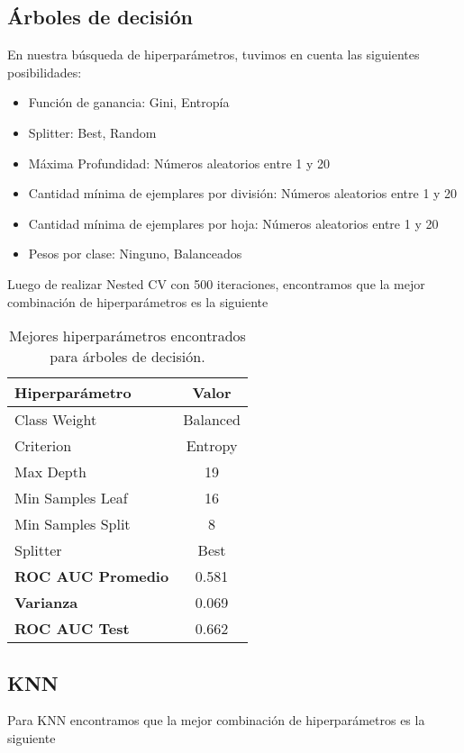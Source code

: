 \documentclass[12pt,a4paper]{article}
\begin{document}
\subsection*{Árboles de decisión}
\par En nuestra búsqueda de hiperparámetros, tuvimos en cuenta las siguientes posibilidades:
\begin{itemize}
    \item Función de ganancia: Gini, Entropía
    \item Splitter: Best, Random
    \item Máxima Profundidad: Números aleatorios entre 1 y 20
    \item Cantidad mínima de ejemplares por división: Números aleatorios entre 1 y 20
    \item Cantidad mínima de ejemplares por hoja: Números aleatorios entre 1 y 20
    \item Pesos por clase: Ninguno, Balanceados
\end{itemize}
\par  Luego de realizar Nested CV con 500 iteraciones, encontramos que la mejor combinación de hiperparámetros es la siguiente
\begin{table}[H]
    \centering
    \begin{tabular}{|l|c|}
    \hline
    \textbf{Hiperparámetro} & \textbf{Valor} \\
    \hline
    Class Weight & Balanced \\
    Criterion & Entropy \\
    Max Depth & 19 \\
    Min Samples Leaf & 16 \\
    Min Samples Split & 8 \\
    Splitter & Best \\
    \hline
    \textbf{ROC AUC Promedio} & 0.581 \\
    \textbf{Varianza} & 0.069 \\
    \textbf{ROC AUC Test} & 0.662 \\
    \hline
    \end{tabular}
    \caption{Mejores hiperparámetros encontrados para árboles de decisión.}
    \label{tab:mejores-hiperparametros-dtree}
\end{table}


\subsection*{KNN} 
\par Para KNN encontramos que la mejor combinación de hiperparámetros es la siguiente
\end{document}
